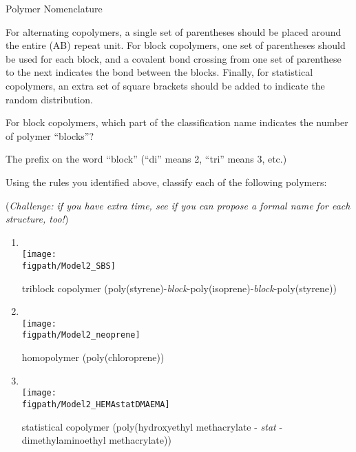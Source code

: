 \begin{activity}{Polymer Nomenclature}
\begin{ctqs}
\begin{enumerate}
				\begin{solution}[2in]{}
				For alternating copolymers, a single set of parentheses should be placed around the entire (AB) repeat unit.  For block copolymers, one set of parentheses should be used for each block, and a covalent bond crossing from one set of parenthese to the next indicates the bond between the blocks.  Finally, for statistical copolymers, an extra set of square brackets should be added to indicate the random distribution.
				\end{solution}
			
		\end{enumerate}
	
	\question For block copolymers, which part of the classification name indicates the number of polymer ``blocks''?
			
				\begin{solution}[0.5in]{}
				The prefix on the word ``block'' (``di'' means 2, ``tri'' means 3, etc.) 
				\end{solution}
		
	\question Using the rules you identified above, classify each of the following polymers: 
	
		(\emph{Challenge: if you have extra time, see if you can propose a formal name for each structure, too!})
	
		\begin{enumerate}
			\item \text{}\\\texttt{[image: \\figpath/Model2\_SBS]}
			
				\begin{solution}[0.25in]{}
					triblock copolymer (poly(styrene)-\emph{block}-poly(isoprene)-\emph{block}-poly(styrene))
				\end{solution}
			
			\item \text{}\\\texttt{[image: \\figpath/Model2\_neoprene]}
			
				\begin{solution}[0.25in]{}
					homopolymer (poly(chloroprene))
				\end{solution}
			
			\item \text{}\\\texttt{[image: \\figpath/Model2\_HEMAstatDMAEMA]}
			
				\begin{solution}[0.25in]{}
					statistical copolymer (poly(hydroxyethyl methacrylate - \emph{stat} - dimethylaminoethyl methacrylate))
				\end{solution}
			

\end{enumerate}
\end{ctqs}
\end{activity}

